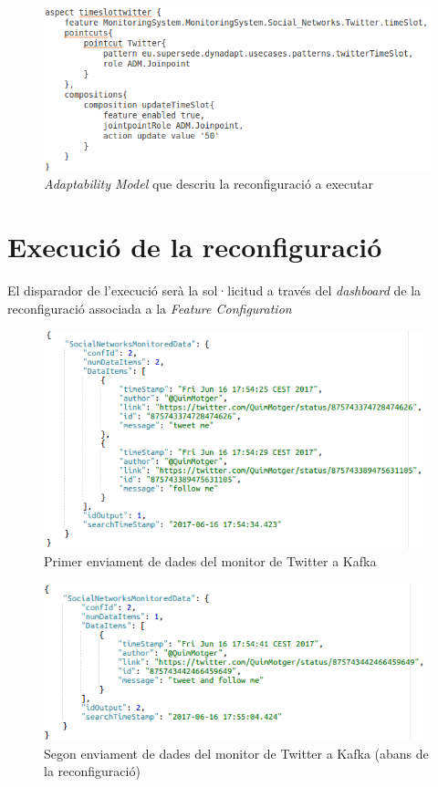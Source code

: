 \begin{figure}
\centering
\includegraphics[width=14cm]{Figures/Figure38}
\decoRule
\caption{\textit{Adaptability Model} que descriu la reconfiguració a executar}
\label{fig:Figura39}
\end{figure} 

\section{Execució de la reconfiguració}

El disparador de l'execució serà la sol·licitud a través del \textit{dashboard} de la reconfiguració associada a la \textit{Feature Configuration} 

\begin{figure}
\centering
\includegraphics[width=11cm]{Figures/tfg1}
\decoRule
\caption{Primer enviament de dades del monitor de Twitter a Kafka}
\label{fig:tfg1}
\end{figure} 

\begin{figure}
\centering
\includegraphics[width=11cm]{Figures/tfg2}
\decoRule
\caption{Segon enviament de dades del monitor de Twitter a Kafka (abans de la reconfiguració)}
\label{fig:tfg2}
\end{figure} 

